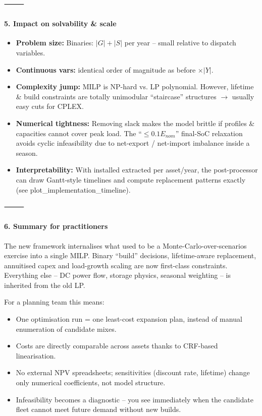 ⸻

\paragraph{5. Impact on solvability \& scale}
\begin{itemize}
    \item \textbf{Problem size:} Binaries: $|G|+ |S|$ per year – small relative to dispatch variables.
    \item \textbf{Continuous vars:} identical order of magnitude as before $\times |Y|$.
    \item \textbf{Complexity jump:} MILP is NP-hard vs. LP polynomial. However, lifetime \& build constraints are totally unimodular “staircase” structures $\rightarrow$ usually easy cuts for CPLEX.
    \item \textbf{Numerical tightness:} Removing slack makes the model brittle if profiles \& capacities cannot cover peak load. The “$\leq 0.1 E_{nom}$” final-SoC relaxation avoids cyclic infeasibility due to net-export / net-import imbalance inside a season.
    \item \textbf{Interpretability:} With installed extracted per asset/year, the post-processor can draw Gantt-style timelines and compute replacement patterns exactly (see plot\_implementation\_timeline).
\end{itemize}

⸻

\paragraph{6. Summary for practitioners}

The new framework internalises what used to be a Monte-Carlo-over-scenarios exercise into a single MILP.
Binary “build” decisions, lifetime-aware replacement, annuitised capex and load-growth scaling are now first-class constraints. Everything else – DC power flow, storage physics, seasonal weighting – is inherited from the old LP.

For a planning team this means:
\begin{itemize}
    \item One optimisation run = one least-cost expansion plan, instead of manual enumeration of candidate mixes.
    \item Costs are directly comparable across assets thanks to CRF-based linearisation.
    \item No external NPV spreadsheets; sensitivities (discount rate, lifetime) change only numerical coefficients, not model structure.
    \item Infeasibility becomes a diagnostic – you see immediately when the candidate fleet cannot meet future demand without new builds.
\end{itemize}

